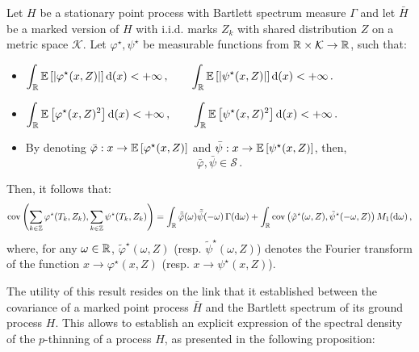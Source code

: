 \begin{theorem}\label{th:chap5_spectral_marked}
    Let $H$ be a stationary point process with Bartlett spectrum measure $\Gamma$ and 
    let $\bar H$ be a marked version of $H$ with i.i.d. marks $Z_k$ with shared distribution $Z$ on a metric space $\mathcal{K}$.
    Let $\varphi^\star, \psi^\star$ be measurable functions from ${\mathbb R} \times \mathcal{K} \to {\mathbb R}$, 
    such that:
    \begin{itemize}
        \item $\displaystyle
            \int_{{\mathbb R}}{{\mathbb E}\left[|\varphi^\star(x, Z)|\right]{\mathrm{d}}(x)} < +\infty\,,\qquad \int_{{\mathbb R}}{{\mathbb E}\left[|\psi^\star(x, Z)|\right]{\mathrm{d}}(x)} < +\infty\,.
        $
        \item $\displaystyle
            \int_{{\mathbb R}}{{\mathbb E}\left[\varphi^\star(x, Z)^2\right]{\mathrm{d}}(x)} < +\infty\,,\qquad\int_{{\mathbb R}}{{\mathbb E}\left[\psi^\star(x, Z)^2\right]{\mathrm{d}}(x)} < +\infty\,.
        $
        \item By denoting $\bar \varphi : x\to {\mathbb E}\left[\varphi^\star(x, Z)\right]$ and $\bar \psi : x\to {\mathbb E}\left[\psi^\star(x, Z)\right]$, then,
              \[\bar \varphi,\bar \psi \in\mathcal{S}\,.\]
    \end{itemize}

    Then, it follows that:
    \begin{equation}\label{eq:chap5_marked_spectrum}
        \operatorname{cov}\left(\sum_{k\in{\mathbb Z}}{\varphi^\star(T_k, Z_k)}, \sum_{k\in{\mathbb Z}}{\psi^\star(T_k, Z_k)}\right) = 
        \int_{{\mathbb R}}{\tilde {\bar\varphi} (\omega) \tilde{\bar \psi} (-\omega)\,\Gamma({\mathrm{d}} \omega)} 
        + \int_{{\mathbb R}}{\operatorname{cov}\left( \tilde \varphi^\star(\omega, Z), \tilde \psi^\star (-\omega, Z)\right)M_1({\mathrm{d}} \omega)}\,,
    \end{equation}
    where, for any $\omega\in{\mathbb R}$, $\tilde \varphi^\star(\omega, Z)$ (resp. $\tilde \psi^\star(\omega, Z)$) denotes the Fourier transform of the function $x\to \varphi^\star(x, Z)$ (resp. $x\to \psi^\star(x, Z)$).
\end{theorem}

The utility of this result resides on the link that it established between the covariance of a marked point process $\bar H$
and the Bartlett spectrum of its ground process $H$. 
This allows to establish an explicit expression of the spectral density of the $p$-thinning of a process $H$, 
as presented in the following proposition:

